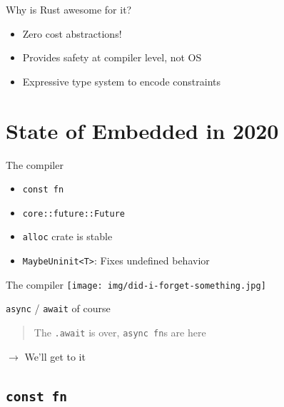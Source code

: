 \documentclass[aspectratio=1610,14pt,t]{beamer}
\begin{document}
\begin{frame}[c]{Why is Rust awesome for it?}
  \begin{itemize}
    \item Zero cost abstractions!
    \item Provides safety at compiler level, not OS
    \item Expressive type system to encode constraints
  \end{itemize}
\end{frame}

\section{State of Embedded in 2020}
\begin{frame}[c]{The compiler}
  \begin{itemize}
    \item \texttt{const fn}
    \item \texttt{core::future::Future}
    \item \texttt{alloc} crate is stable
    \item \texttt{MaybeUninit<T>}: Fixes undefined behavior
  \end{itemize}
\end{frame}

\begin{frame}[c]{The compiler}
  \texttt{[image: img/did-i-forget-something.jpg]}
\end{frame}

\begin{frame}[c]{\texttt{async} / \texttt{await} of course}

  \begin{quote}
    The \texttt{.await} is over, \texttt{async fn}s are here
  \end{quote}

  $\rightarrow$ We'll get to it
\end{frame}

\subsection{\texttt{const fn}}
\end{document}
